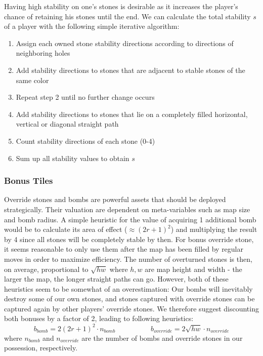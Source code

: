 \documentclass[a4paper,12pt]{article}
\begin{document}
Having high stability on one's stones is desirable as it increases the player's chance of retaining his stones until the end. We can calculate the total stability $s$ of a player with the following simple iterative algorithm:

\begin{enumerate}
\item Assign each owned stone stability directions according to directions of neighboring holes
\item Add stability directions to stones that are adjacent to stable stones of the same color
\item Repeat step 2 until no further change occurs
\item Add stability directions to stones that lie on a completely filled horizontal, vertical or diagonal straight path
\item Count stability directions of each stone (0-4)
\item Sum up all stability values to obtain $s$
\end{enumerate}


\subsubsection{Bonus Tiles}
Override stones and bombs are powerful assets that should be deployed strategically. Their valuation are dependent on meta-variables such as map size and bomb radius. A simple heuristic for the value of acquiring 1 additional bomb would be to calculate its area of effect ($\approx (2r+1)^2$) and multiplying the result by 4 since all stones will be completely stable by then. For bonus override stone, it seems reasonable to only use them after the map has been filled by regular moves in order to maximize efficiency. The number of overturned stones is then, on average, proportional to $\sqrt{hw}$ where $h, w$ are map height and width - the larger the map, the longer straight paths can go. However, both of these heuristics seem to be somewhat of an overestimation: Our bombs will inevitably destroy some of our own stones, and stones captured with override stones can be captured again by other players' override stones. We therefore suggest discounting both bonuses by a factor of 2, leading to following heuristics: 
\[ b_{bomb} = 2(2r+1)^2 \cdot n_{bomb} \quad \quad \quad \quad \quad b_{override} = 2 \sqrt{hw} \cdot n_{override}\]
where $n_{bomb}$ and $n_{override}$ are the number of bombs and override stones in our possession, respectively.
 
\end{document}
